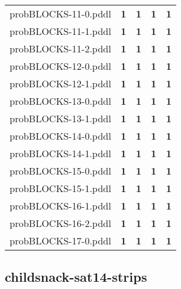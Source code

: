 \documentclass{article}
\begin{document}
\begin{tabular}{@{}lrrrr@{}}
probBLOCKS-11-0.pddl & \textbf{1} & \textbf{1} & \textbf{1} & \textbf{1} \\
probBLOCKS-11-1.pddl & \textbf{1} & \textbf{1} & \textbf{1} & \textbf{1} \\
probBLOCKS-11-2.pddl & \textbf{1} & \textbf{1} & \textbf{1} & \textbf{1} \\
probBLOCKS-12-0.pddl & \textbf{1} & \textbf{1} & \textbf{1} & \textbf{1} \\
probBLOCKS-12-1.pddl & \textbf{1} & \textbf{1} & \textbf{1} & \textbf{1} \\
probBLOCKS-13-0.pddl & \textbf{1} & \textbf{1} & \textbf{1} & \textbf{1} \\
probBLOCKS-13-1.pddl & \textbf{1} & \textbf{1} & \textbf{1} & \textbf{1} \\
probBLOCKS-14-0.pddl & \textbf{1} & \textbf{1} & \textbf{1} & \textbf{1} \\
probBLOCKS-14-1.pddl & \textbf{1} & \textbf{1} & \textbf{1} & \textbf{1} \\
probBLOCKS-15-0.pddl & \textbf{1} & \textbf{1} & \textbf{1} & \textbf{1} \\
probBLOCKS-15-1.pddl & \textbf{1} & \textbf{1} & \textbf{1} & \textbf{1} \\
probBLOCKS-16-1.pddl & \textbf{1} & \textbf{1} & \textbf{1} & \textbf{1} \\
probBLOCKS-16-2.pddl & \textbf{1} & \textbf{1} & \textbf{1} & \textbf{1} \\
probBLOCKS-17-0.pddl & \textbf{1} & \textbf{1} & \textbf{1} & \textbf{1} \\
\end{tabular}

\hypertarget{coverage-childsnack-sat14-strips}{}
\subsection*{childsnack-sat14-strips}
\end{document}
